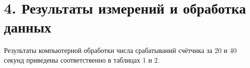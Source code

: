 \section*{4. Результаты измерений и обработка данных}


Результаты компьютерной обработки числа срабатываний счётчика за 20 и 40 секунд приведены соответственно в таблицах 1 и 2.\\\\\\\\\


